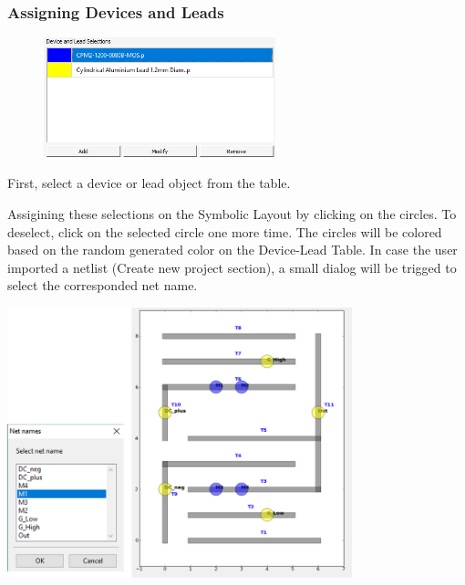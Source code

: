 \documentclass[11pt]{article}
\begin{document}
\pagebreak

\subsubsection{Assigning Devices and Leads}
\label{sec-2-3-5}

\begin{figure}
\centering
\includegraphics[width=0.6\textwidth]{./figs/10_DeviceLead.png}
\end{figure}

First, select a device or lead object from the table.

Assigining these selections on the Symbolic Layout by clicking on the circles. To deselect, click on the selected circle one more time. The circles will be colored based on the random generated color on the Device-Lead Table.
In case the user imported a netlist (Create new project section), a small dialog will be trigged to select the corresponded net name.

\begin{center}
\includegraphics[width=10cm]{./figs/11_NetNames.png}
\end{center}

\pagebreak
\end{document}

